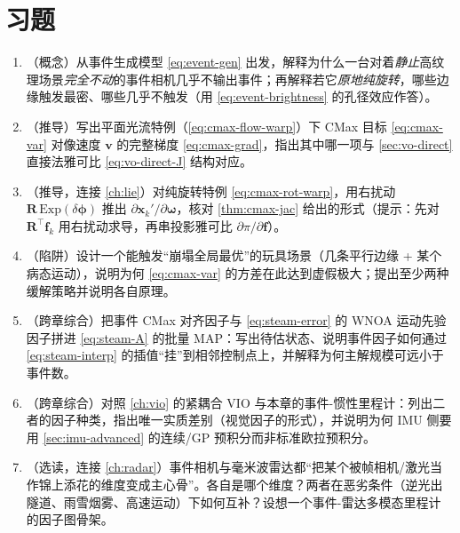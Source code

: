\section*{习题}
\begin{practice}
\begin{enumerate}
  \item （概念）从事件生成模型 \cref{eq:event-gen} 出发，解释为什么一台对着\emph{静止}高纹理场景\emph{完全不动}的事件相机几乎不输出事件；再解释若它\emph{原地纯旋转}，哪些边缘触发最密、哪些几乎不触发（用 \cref{eq:event-brightness} 的孔径效应作答）。
  \item （推导）写出平面光流特例（\cref{eq:cmax-flow-warp}）下 CMax 目标 \cref{eq:cmax-var} 对像速度 $\mathbf v$ 的完整梯度 \cref{eq:cmax-grad}，指出其中哪一项与 \cref{sec:vo-direct} 直接法雅可比 \cref{eq:vo-direct-J} 结构对应。
  \item （推导，连接 \cref{ch:lie}）对纯旋转特例 \cref{eq:cmax-rot-warp}，用右扰动 $\mathbf R\,\mathrm{Exp}(\delta\boldsymbol\phi)$ 推出 $\partial\mathbf x_k'/\partial\boldsymbol\omega$，核对 \cref{thm:cmax-jac} 给出的形式（提示：先对 $\mathbf R^\top\mathbf f_k$ 用右扰动求导，再串投影雅可比 $\partial\pi/\partial\mathbf f$）。
  \item （陷阱）设计一个能触发“崩塌全局最优”的玩具场景（几条平行边缘 + 某个病态运动），说明为何 \cref{eq:cmax-var} 的方差在此达到虚假极大；提出至少两种缓解策略并说明各自原理。
  \item （跨章综合）把事件 CMax 对齐因子与 \cref{eq:steam-error} 的 WNOA 运动先验因子拼进 \cref{eq:steam-A} 的批量 MAP：写出待估状态、说明事件因子如何通过 \cref{eq:steam-interp} 的插值“挂”到相邻控制点上，并解释为何主解规模可远小于事件数。
  \item （跨章综合）对照 \cref{ch:vio} 的紧耦合 VIO 与本章的事件-惯性里程计：列出二者的因子种类，指出唯一实质差别（视觉因子的形式），并说明为何 IMU 侧要用 \cref{sec:imu-advanced} 的连续/GP 预积分而非标准欧拉预积分。
  \item （选读，连接 \cref{ch:radar}）事件相机与毫米波雷达都“把某个被帧相机/激光当作锦上添花的维度变成主心骨”。各自是哪个维度？两者在恶劣条件（逆光出隧道、雨雪烟雾、高速运动）下如何互补？设想一个事件-雷达多模态里程计的因子图骨架。
\end{enumerate}
\end{practice}
